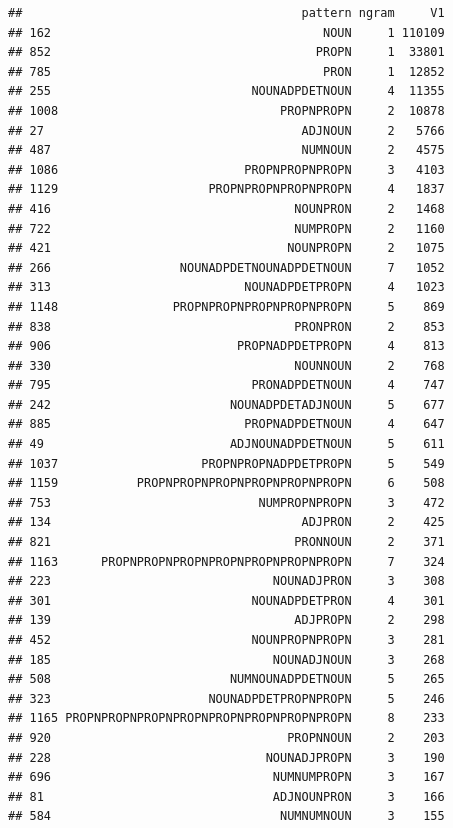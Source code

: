 \documentclass[]{article}
\begin{document}
\begin{verbatim}
##                                       pattern ngram     V1
## 162                                      NOUN     1 110109
## 852                                     PROPN     1  33801
## 785                                      PRON     1  12852
## 255                            NOUNADPDETNOUN     4  11355
## 1008                               PROPNPROPN     2  10878
## 27                                    ADJNOUN     2   5766
## 487                                   NUMNOUN     2   4575
## 1086                          PROPNPROPNPROPN     3   4103
## 1129                     PROPNPROPNPROPNPROPN     4   1837
## 416                                  NOUNPRON     2   1468
## 722                                  NUMPROPN     2   1160
## 421                                 NOUNPROPN     2   1075
## 266                  NOUNADPDETNOUNADPDETNOUN     7   1052
## 313                           NOUNADPDETPROPN     4   1023
## 1148                PROPNPROPNPROPNPROPNPROPN     5    869
## 838                                  PRONPRON     2    853
## 906                          PROPNADPDETPROPN     4    813
## 330                                  NOUNNOUN     2    768
## 795                            PRONADPDETNOUN     4    747
## 242                         NOUNADPDETADJNOUN     5    677
## 885                           PROPNADPDETNOUN     4    647
## 49                          ADJNOUNADPDETNOUN     5    611
## 1037                    PROPNPROPNADPDETPROPN     5    549
## 1159           PROPNPROPNPROPNPROPNPROPNPROPN     6    508
## 753                             NUMPROPNPROPN     3    472
## 134                                   ADJPRON     2    425
## 821                                  PRONNOUN     2    371
## 1163      PROPNPROPNPROPNPROPNPROPNPROPNPROPN     7    324
## 223                               NOUNADJPRON     3    308
## 301                            NOUNADPDETPRON     4    301
## 139                                  ADJPROPN     2    298
## 452                            NOUNPROPNPROPN     3    281
## 185                               NOUNADJNOUN     3    268
## 508                         NUMNOUNADPDETNOUN     5    265
## 323                      NOUNADPDETPROPNPROPN     5    246
## 1165 PROPNPROPNPROPNPROPNPROPNPROPNPROPNPROPN     8    233
## 920                                 PROPNNOUN     2    203
## 228                              NOUNADJPROPN     3    190
## 696                               NUMNUMPROPN     3    167
## 81                                ADJNOUNPRON     3    166
## 584                                NUMNUMNOUN     3    155

\end{verbatim}
\end{document}
